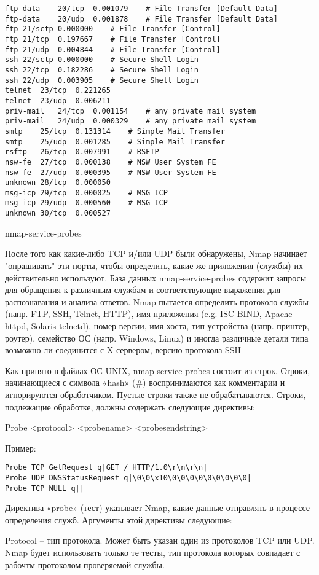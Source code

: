 \documentclass[12pt,a4paper]{report}
\begin{document}
\begin{verbatim}
ftp-data	20/tcp	0.001079	# File Transfer [Default Data]
ftp-data	20/udp	0.001878	# File Transfer [Default Data]
ftp	21/sctp	0.000000	# File Transfer [Control]
ftp	21/tcp	0.197667	# File Transfer [Control]
ftp	21/udp	0.004844	# File Transfer [Control]
ssh	22/sctp	0.000000	# Secure Shell Login
ssh	22/tcp	0.182286	# Secure Shell Login
ssh	22/udp	0.003905	# Secure Shell Login
telnet	23/tcp	0.221265
telnet	23/udp	0.006211
priv-mail	24/tcp	0.001154	# any private mail system
priv-mail	24/udp	0.000329	# any private mail system
smtp	25/tcp	0.131314	# Simple Mail Transfer
smtp	25/udp	0.001285	# Simple Mail Transfer
rsftp	26/tcp	0.007991	# RSFTP
nsw-fe	27/tcp	0.000138	# NSW User System FE
nsw-fe	27/udp	0.000395	# NSW User System FE
unknown	28/tcp	0.000050
msg-icp	29/tcp	0.000025	# MSG ICP
msg-icp	29/udp	0.000560	# MSG ICP
unknown	30/tcp	0.000527
\end{verbatim}



nmap-service-probes

После того как какие-либо TCP и/или UDP были обнаружены, Nmap начинает "опрашивать" эти порты, чтобы определить, какие же приложения (службы) их действительно используют. База данных nmap-service-probes содержит запросы для обращения к различным службам и соответствующие выражения для распознавания и анализа ответов. Nmap пытается определить протоколо службы (напр. FTP, SSH, Telnet, HTTP), имя приложения (e.g. ISC BIND, Apache httpd, Solaris telnetd), номер версии, имя хоста, тип устройства (напр. принтер, роутер), семейство ОС (напр. Windows, Linux) и иногда различные детали типа возможно ли соединится с X сервером, версию протокола SSH

Как принято в файлах ОС UNIX, nmap-service-probes состоит из строк. Строки, начинающиеся с символа «hash» (\#) воспринимаются как комментарии и игнорируются обработчиком. Пустые строки также не обрабатываются. Строки, подлежащие обработке, должны содержать следующие директивы:

Probe <protocol> <probename> <probesendstring>

Пример:
\begin{verbatim}
Probe TCP GetRequest q|GET / HTTP/1.0\r\n\r\n|
Probe UDP DNSStatusRequest q|\0\0\x10\0\0\0\0\0\0\0\0\0|
Probe TCP NULL q||
\end{verbatim}


Директива «probe» (тест) указывает Nmap, какие данные отправлять в процессе определения служб. Аргументы этой директивы следующие:

Protocol – тип протокола. Может быть указан один из протоколов TCP или UDP. Nmap будет использовать только те тесты, тип протокола которых совпадает с рабочтм протоколом проверяемой службы.
\end{document}
